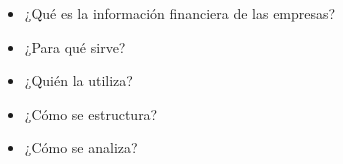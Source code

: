 \documentclass{nuevotema}
\begin{document}

\begin{itemize}
    \item ¿Qué es la información financiera de las empresas?
    \item ¿Para qué sirve?
    \item ¿Quién la utiliza?
    \item ¿Cómo se estructura?
    \item ¿Cómo se analiza?
\end{itemize}


\esquemacorto
\end{document}
